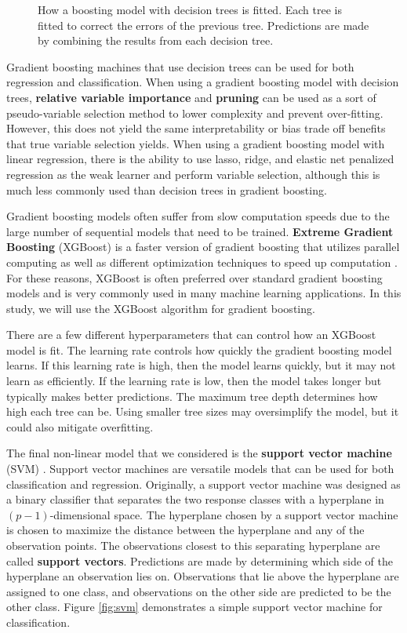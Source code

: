 \documentclass{article}
\begin{document}
	\begin{figure}[b!]
		\footnotesize
		\centering
		
		\captionsetup{width = 0.8\textwidth}
		\caption{How a boosting model with decision trees is fitted. Each tree is fitted to correct the errors of the previous tree. Predictions are made by combining the results from each decision tree.}
		\label{fig:boosting}
	\end{figure}
	
	Gradient boosting machines that use decision trees can be used for both regression and classification. When using a gradient boosting model with decision trees, \textbf{relative variable importance} and \textbf{pruning} can be used as a sort of pseudo-variable selection method to lower complexity and prevent over-fitting. However, this does not yield the same interpretability or bias trade off benefits that true variable selection yields. When using a gradient boosting model with linear regression, there is the ability to use lasso, ridge, and elastic net penalized regression as the weak learner and perform variable selection, although this is much less commonly used than decision trees in gradient boosting.
	
	Gradient boosting models often suffer from slow computation speeds due to the large number of sequential models that need to be trained. \textbf{Extreme Gradient Boosting} (XGBoost) is a faster version of gradient boosting that utilizes parallel computing as well as different optimization techniques to speed up computation \cite{chen2016xgboost}. For these reasons, XGBoost is often preferred over standard gradient boosting models and is very commonly used in many machine learning applications. In this study, we will use the XGBoost algorithm for gradient boosting.
	
	There are a few different hyperparameters that can control how an XGBoost model is fit. The learning rate controls how quickly the gradient boosting model learns. If this learning rate is high, then the model learns quickly, but it may not learn as efficiently. If the learning rate is low, then the model takes longer but typically makes better predictions. The maximum tree depth determines how high each tree can be. Using smaller tree sizes may oversimplify the model, but it could also mitigate overfitting.
	
	The final non-linear model that we considered is the \textbf{support vector machine} (SVM) \cite{cortes1995support}. Support vector machines are versatile models that can be used for both classification and regression. Originally, a support vector machine was designed as a binary classifier that separates the two response classes with a hyperplane in $(p - 1)$-dimensional space. The hyperplane chosen by a support vector machine is chosen to maximize the distance between the hyperplane and any of the observation points. The observations closest to this separating hyperplane are called \textbf{support vectors}. Predictions are made by determining which side of the hyperplane an observation lies on. Observations that lie above the hyperplane are assigned to one class, and observations on the other side are predicted to be the other class. Figure \ref{fig:svm} demonstrates a simple support vector machine for classification.
	
\end{document}
